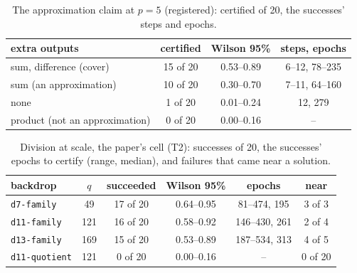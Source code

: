 \documentclass[11pt]{article}
\begin{document}
\begin{table}[t]
\centering
\caption{The approximation claim at $p = 5$ (registered): certified of 20, the successes' steps and epochs.}
\label{tab:approximation}
\begin{tabular}{lccc}
\toprule
extra outputs & certified & Wilson 95\% & steps, epochs \\
\midrule
sum, difference (cover) & 15 of 20 & 0.53--0.89 & 6--12, 78--235 \\
sum (an approximation) & 10 of 20 & 0.30--0.70 & 7--11, 64--160 \\
none & 1 of 20 & 0.01--0.24 & 12, 279 \\
product (not an approximation) & 0 of 20 & 0.00--0.16 & -- \\
\bottomrule
\end{tabular}
\end{table}

\begin{table}[t]
\centering
\caption{Division at scale, the paper's cell (T2): successes of 20, the successes' epochs to certify
(range, median), and failures that came near a solution.}
\label{tab:scale}
\begin{tabular}{lccccc}
\toprule
backdrop & $q$ & succeeded & Wilson 95\% & epochs & near \\
\midrule
\texttt{d7-family} & 49 & 17 of 20 & 0.64--0.95 & 81--474, 195 & 3 of 3 \\
\texttt{d11-family} & 121 & 16 of 20 & 0.58--0.92 & 146--430, 261 & 2 of 4 \\
\texttt{d13-family} & 169 & 15 of 20 & 0.53--0.89 & 187--534, 313 & 4 of 5 \\
\texttt{d11-quotient} & 121 & 0 of 20 & 0.00--0.16 & -- & 0 of 20 \\
\bottomrule
\end{tabular}
\end{table}
\end{document}
